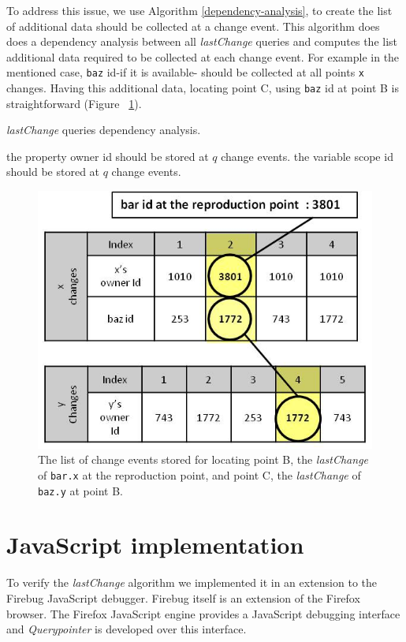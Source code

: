 \documentclass[preprint]{sigplanconf}
\begin{document}
To address this issue, we use Algorithm \ref{dependency-analysis}, to
create the list of additional data should be collected at a change
event. This algorithm does does a dependency analysis between all
\textit{lastChange} queries and computes the list additional data
required to be collected at each change event. For example in the
mentioned case, \texttt{baz} id-if it is available- should be
collected at all points \texttt{x} changes. Having this additional
data, locating point C, using \texttt{baz} id at point B is
straightforward (Figure ~\ref{fig:lastchange-lastchange}).

\begin{algorithm}
\caption{\textit{lastChange} queries dependency analysis.}
\label{dependency-analysis}
\begin{algorithmic}

     \STATE the property owner id should be stored at $q$ change events. 
     \STATE the variable scope id should be stored at $q$ change events.
	 \ENDIF 
 \ENDFOR 
\ENDFOR

\end{algorithmic}
\end{algorithm}

\begin{figure}[htp]
\includegraphics[width=.48\textwidth]{8-lastchange-lastchange.jpg}
\caption{The list of change events stored for locating point B, the
  \textit{lastChange} of \texttt{bar.x} at the reproduction point, and
  point C, the \textit{lastChange} of \texttt{baz.y} at point B.}
\label{fig:lastchange-lastchange}
\end{figure}



\section{JavaScript implementation}
To verify the \textit{lastChange} algorithm we
implemented it in an extension to the Firebug
JavaScript debugger\cite{Firebug}. %
Firebug itself is an extension of the Firefox browser\cite{Firefox}. %
The Firefox JavaScript engine provides a JavaScript debugging interface \cite{JSD} and
\textit{Querypointer} is developed over this interface. 
\end{document}

